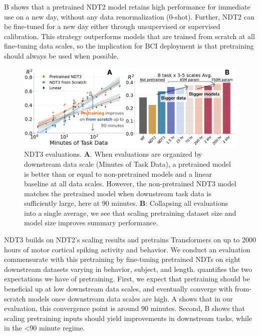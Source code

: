 \documentclass[12pt,oneside]{report}
\begin{document}
B shows that a pretrained NDT2 model retains high performance for immediate use on a new day, without any data renormalization (0-shot). Further, NDT2 can be fine-tuned for a new day either through unsupervised or supervised calibration. This strategy outperforms models that are trained from scratch at all fine-tuning data scales, so the implication for BCI deployment is that pretraining should always be used when possible.

\begin{figure}[h]
  \centering
  \includegraphics[width=0.8\linewidth]{ch2_ndt3_summary.png}
  \caption{NDT3 evaluations. \textbf{A}. When evaluations are organized by downstream data scale (Minutes of Task Data), a pretrained model is better than or equal to non-pretrained models and a linear baseline at all data scales. However, the non-pretrained NDT3 model matches the pretrained model when downstream task data is sufficiently large, here at 90 minutes. \textbf{B}: Collapsing all evaluations into a single average, we see that scaling pretraining dataset size and model size improves summary performance.}
  \label{fig:ndt3_summary}
\end{figure}


NDT3 builds on NDT2’s scaling results and pretrains Transformers on up to 2000 hours of motor cortical spiking activity and behavior. We conduct an evaluation commensurate with this pretraining by fine-tuning pretrained NDTs on eight downstream datasets varying in behavior, subject, and length.  quantifies the two expectations we have of pretraining. First, we expect that pretraining should be beneficial up at low downstream data scales, and eventually converge with from-scratch models once downstream data scales are high. A shows that in our evaluation, this convergence point is around 90 minutes. Second, B shows that scaling pretraining inputs should yield improvements in downstream tasks, while in the <90 minute regime.
\end{document}
